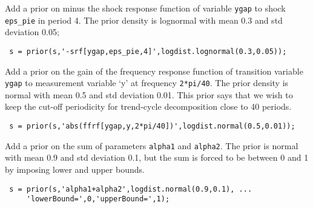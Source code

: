  Add a prior on minus the shock response function of variable
 \texttt{ygap} to shock \texttt{eps\_pie} in period 4. The prior density
 is lognormal with mean 0.3 and std deviation 0.05;
 
 \begin{verbatim}
 s = prior(s,'-srf[ygap,eps_pie,4]',logdist.lognormal(0.3,0.05));
 \end{verbatim}
 
 Add a prior on the gain of the frequency response function of transition
 variable \texttt{ygap} to measurement variable `y' at frequency
 \texttt{2*pi/40}. The prior density is normal with mean 0.5 and std
 deviation 0.01. This prior says that we wish to keep the cut-off
 periodicity for trend-cycle decomposition close to 40 periods.
 
 \begin{verbatim}
 s = prior(s,'abs(ffrf[ygap,y,2*pi/40])',logdist.normal(0.5,0.01));
 \end{verbatim}
 
 Add a prior on the sum of parameters \texttt{alpha1} and
 \texttt{alpha2}. The prior is normal with mean 0.9 and std deviation
 0.1, but the sum is forced to be between 0 and 1 by imposing lower and
 upper bounds.
 
 \begin{verbatim}
 s = prior(s,'alpha1+alpha2',logdist.normal(0.9,0.1), ...
     'lowerBound=',0,'upperBound=',1);
 \end{verbatim}



